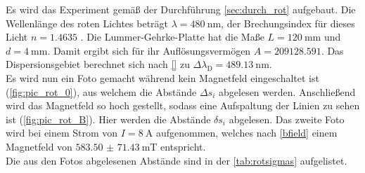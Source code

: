   \noindent Es wird das Experiment gemäß der Durchführung \ref{sec:durch_rot} aufgebaut. Die Wellenlänge des roten Lichtes beträgt 
  $\lambda = \SI{480}{\nano\metre}$, der Brechungsindex für dieses Licht $n = \num{1.4635}$ \cite{V27}. Die Lummer-Gehrke-Platte hat die 
  Maße $L = \SI{120}{\milli\metre}$ und $d = \SI{4}{\milli\metre}$. Damit ergibt sich für ihr Auflösungsvermögen $ A = \num{209128.591}$. 
  Das Dispersionsgebiet berechnet sich nach \eqref{} zu $\Delta \lambda_\text{D} = \SI{489.13}{\nano\metre}$. \\ 

  \noindent 
  Es wird nun ein Foto gemacht während kein Magnetfeld eingeschaltet ist (\autoref{fig:pic_rot_0}), aus welchem die Abstände $\Delta s_i$ 
  abgelesen werden. Anschließend wird das Magnetfeld so hoch gestellt, sodass eine Aufspaltung der Linien zu sehen ist (\autoref{fig:pic_rot_B}). 
  Hier werden die Abstände $\delta s_i$ abgelesen.  
  Das zweite Foto wird bei einem Strom von $I = \SI{8}{\ampere}$ aufgenommen, welches nach \eqref{bfield} einem Magnetfeld von $\SI{583.50(7143)}{\milli\tesla}$
  entspricht. \\
  Die aus den Fotos abgelesenen Abstände sind in der \autoref{tab:rotsigmas} aufgelistet. 
